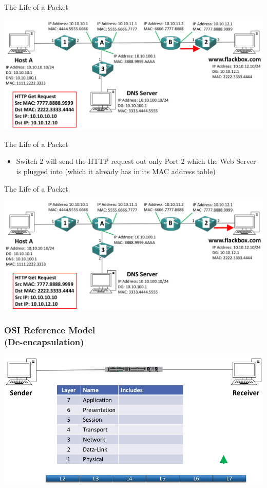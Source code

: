 \documentclass[pdflatex,compress,mathserif]{beamer}
\begin{document}
\begin{frame}{The Life of a Packet}
	\begin{center}
		\includegraphics[width=\linewidth]{img/img53}
	\end{center}
\end{frame}

\begin{frame}{The Life of a Packet}
	\begin{itemize}
		\item Switch 2 will send the HTTP request out only Port 2 which the Web Server is plugged into (which it already has in its MAC address table)
	\end{itemize}
\end{frame}

\begin{frame}{The Life of a Packet}
	\begin{center}
		\includegraphics[width=\linewidth]{img/img54}
	\end{center}
\end{frame}

\begin{frame}
	\frametitle{OSI Reference Model\\(De-encapsulation)}
	\begin{center}
		\includegraphics[width=\linewidth]{img/img55}
	\end{center}
\end{frame}
\end{document}
